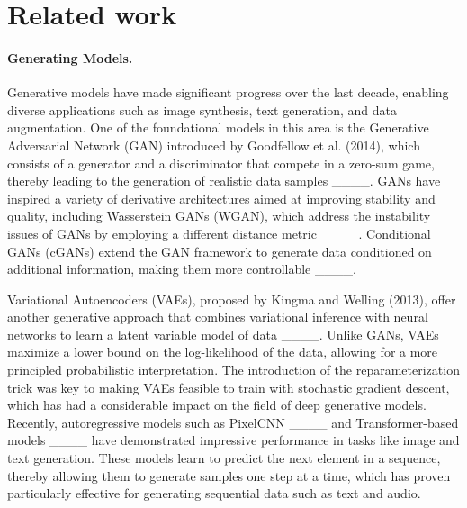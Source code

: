 \section{Related work}
\label{sec:related_work}

\paragraph{Generating Models.}
Generative models have made significant progress over the last decade, enabling diverse applications such as image synthesis, text generation, and data augmentation. One of the foundational models in this area is the Generative Adversarial Network (GAN) introduced by Goodfellow et al. (2014), which consists of a generator and a discriminator that compete in a zero-sum game, thereby leading to the generation of realistic data samples ____. GANs have inspired a variety of derivative architectures aimed at improving stability and quality, including Wasserstein GANs (WGAN), which address the instability issues of GANs by employing a different distance metric ____. Conditional GANs (cGANs) extend the GAN framework to generate data conditioned on additional information, making them more controllable ____. 

Variational Autoencoders (VAEs), proposed by Kingma and Welling (2013), offer another generative approach that combines variational inference with neural networks to learn a latent variable model of data ____. Unlike GANs, VAEs maximize a lower bound on the log-likelihood of the data, allowing for a more principled probabilistic interpretation. The introduction of the reparameterization trick was key to making VAEs feasible to train with stochastic gradient descent, which has had a considerable impact on the field of deep generative models. Recently, autoregressive models such as PixelCNN ____ and Transformer-based models ____ have demonstrated impressive performance in tasks like image and text generation. These models learn to predict the next element in a sequence, thereby allowing them to generate samples one step at a time, which has proven particularly effective for generating sequential data such as text and audio. 

